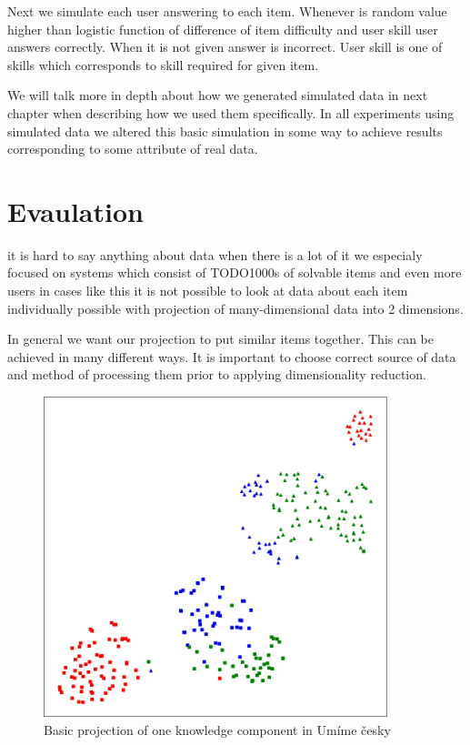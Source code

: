 \documentclass[
  digital, %
  table,   %
  nolof,     %
  nolot,     %
  nocover
]{fithesis3}
\begin{document}
Next we simulate each user answering to each item. Whenever is random value higher than logistic function of difference of item difficulty and user skill user answers correctly. When it is not given answer is incorrect. User skill is one of skills which corresponds to skill required for given item.

We will talk more in depth about how we generated simulated data in next chapter when describing how we used them specifically. In all experiments using simulated data we altered this basic simulation in some way to achieve results corresponding to some attribute of real data.

\section{Evaulation}\label{evaulation}




it is hard to say anything about data when there is a lot of it we
especialy focused on systems which consist of TODO1000s of solvable
items and even more users in cases like this it is not possible to look
at data about each item individually possible with projection of
many-dimensional data into 2 dimensions.


In general we want our projection to put similar items together. This
can be achieved in many different ways. It is important to choose
correct source of data and method of processing them prior to applying
dimensionality reduction.


\begin{figure}
  \begin{center}
    \includegraphics[width=10cm]{img/common_projection}
  \end{center}
  \caption{Basic projection of one knowledge component in Umíme česky}
  \label{fig:commonprojection}
\end{figure}
\end{document}
